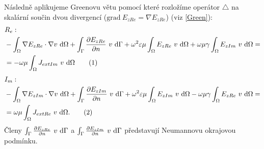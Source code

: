 \documentclass[12pt,a4paper,oneside]{article}
\numberwithin{equation}{section} %
\numberwithin{figure}{section} %
\numberwithin{table}{section} %
\newcommand{\grad}{\mathrm{grad}\ }
\newcommand\numberthis{\addtocounter{equation}{1}\tag{\theequation}}
\begin{document}
Následně aplikujeme Greenovu větu pomocí které rozložíme operátor $\triangle$ na skalární součin dvou divergencí ($\grad E _{zRe} = \nabla E _{zRe}$) (viz \ref{Green}):
\begin{align*}
&R_e:
\\
&- \int _{\Omega} \nabla E _{zRe} \cdot \nabla v ~ \ud \Omega + \int _{\Gamma} \frac{\partial E _{zRe}}{\partial n} ~ v ~ \ud \Gamma + \omega ^2 \varepsilon \mu \int _{\Omega} E _{zRe} ~ v ~ \ud \Omega + \omega \mu \gamma \int _{\Omega} E _{zIm} ~ v ~ \ud \Omega = 
\\
&= - \omega \mu \int _{\Omega} J _{extIm} ~ v ~ \ud \Omega
\numberthis
\end{align*}
\begin{align*}
&I_m:
\\
&- \int _{\Omega} \nabla E _{zIm} \cdot \nabla v ~ \ud \Omega + \int _{\Gamma} \frac{\partial E _{zIm}}{\partial n} ~ v ~ \ud \Gamma + \omega ^2 \varepsilon \mu \int _{\Omega} E _{zIm} ~ v ~ \ud \Omega - \omega \mu \gamma \int _{\Omega} E _{zRe} ~ v ~ \ud \Omega = 
\\
&= \omega \mu \int _{\Omega} J _{extRe} ~ v ~ \ud \Omega .
\numberthis
\end{align*}
Členy $\int _{\Gamma} \frac{\partial E _{zRe}}{\partial n} ~ v ~ \mathrm{d} \Gamma$ a $\int _{\Gamma} \frac{\partial E _{zIm}}{\partial n} ~ v ~ \mathrm{d} \Gamma$ představují Neumannovu okrajovou podmínku. 
\end{document}
